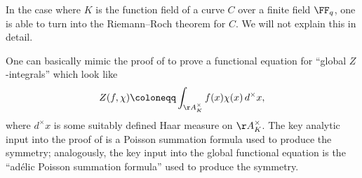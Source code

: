 \documentclass{article}
\begin{document}
\begin{remark}[Reed]
	In the case where $K$ is the function field of a curve $C$ over a finite field $\FF_q$, one is able to turn  into the Riemann--Roch theorem for $C$. We will not explain this in detail.
\end{remark}
\begin{remark}
	One can basically mimic the proof of  to prove a functional equation for ``global $Z$-integrals'' which look like
	\[Z(f,\chi)\coloneqq\int_{\AA_K^\times}f(x)\chi(x)\,d^\times x,\]
	where $d^\times x$ is some suitably defined Haar measure on $\AA_K^\times$. The key analytic input into the proof of  is a Poisson summation formula used to produce the symmetry; analogously, the key input into the global functional equation is the ``ad\'elic Poisson summation formula''  used to produce the symmetry.
\end{remark}
\end{document}
